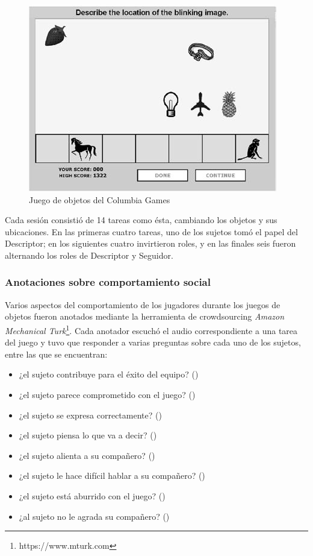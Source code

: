 \begin{figure}[t]
\centering
\includegraphics[scale=0.35]{images/columbia_games.jpg}
\caption{Juego de objetos del Columbia Games}
\label{objects_game}
\end{figure}


Cada sesión consistió de 14 tareas como ésta, cambiando los objetos y sus ubicaciones. En las primeras cuatro tareas, uno de los sujetos tomó el papel del Descriptor; en los siguientes cuatro invirtieron roles, y en las finales seis fueron alternando los roles de Descriptor y Seguidor.

\subsubsection{Anotaciones sobre comportamiento social}

Varios aspectos del comportamiento de los jugadores durante los juegos de objetos fueron anotados mediante la herramienta de crowdsourcing \emph{Amazon Mechanical Turk}\footnote{https://www.mturk.com}. Cada anotador escuchó el audio correspondiente a una tarea del juego y tuvo que responder a varias preguntas sobre cada uno de los sujetos, entre las que se encuentran:

\begin{itemize}
  \item ¿el sujeto contribuye para el éxito del equipo?  (\svcontributes)
  \item ¿el sujeto parece comprometido con el juego? (\svengaged)
  \item ¿el sujeto se expresa correctamente? (\svclear)
  \item ¿el sujeto piensa lo que va a decir? (\svplanning)
  \item ¿el sujeto alienta a su compañero? (\svencourages)
  \item ¿el sujeto le hace difícil hablar a su compañero? (\svdifficult)
  \item ¿el sujeto está aburrido con el juego? (\svbored)
  \item ¿al sujeto no le agrada su compañero? (\svdislikes)
\end{itemize}

